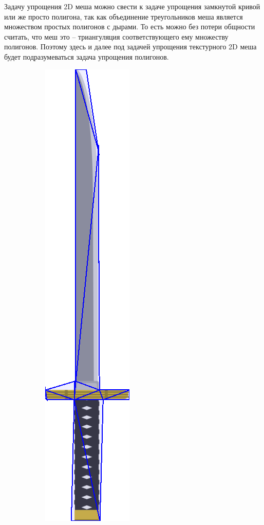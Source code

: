 \documentclass{fefu_thesis/cls/fefu}
\begin{document}
    Задачу упрощения 2D меша можно свести к задаче упрощения замкнутой кривой или же просто полигона, так как объединение треугольников меша является множеством простых полигонов с дырами. То есть можно без потери общности считать, что меш это -- триангуляция соответствующего ему множеству полигонов. Поэтому здесь и далее под задачей упрощения текстурного 2D меша будет подразумеваться задача упрощения полигонов.

    \begin{figure}[H]
        \centering
        \begin{subfigure}[c]{.49\linewidth}
            \centering
            \includegraphics{images/katana_15v.png}

\end{subfigure}
\end{figure}
\end{document}
